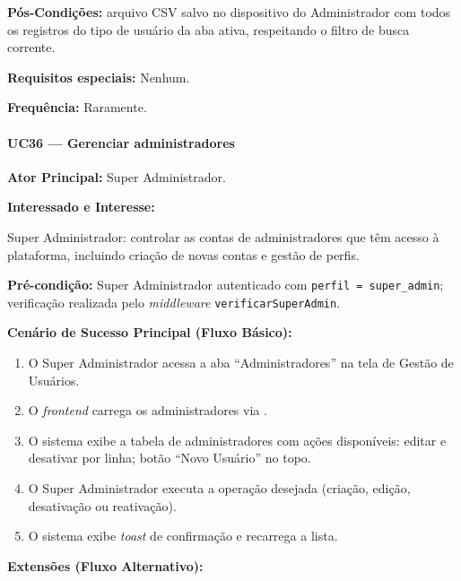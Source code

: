 \textbf{Pós-Condições:} arquivo CSV salvo no dispositivo
do Administrador com todos os registros do tipo de
usuário da aba ativa, respeitando o filtro de busca
corrente.

\textbf{Requisitos especiais:} Nenhum.

\textbf{Frequência:} Raramente.

\paragraph{UC36 --- Gerenciar administradores}\hfill\break

\textbf{Ator Principal:} Super Administrador.

\textbf{Interessado e Interesse:}

Super Administrador: controlar as contas de administradores
que têm acesso à plataforma, incluindo criação de novas
contas e gestão de perfis.

\textbf{Pré-condição:} Super Administrador autenticado
com \texttt{perfil = super\_admin}; verificação realizada
pelo \textit{middleware} \texttt{verificarSuperAdmin}.

\textbf{Cenário de Sucesso Principal (Fluxo Básico):}
\begin{enumerate}
  \item O Super Administrador acessa a aba
        ``Administradores'' na tela de Gestão de Usuários.
  \item O \textit{frontend} carrega os administradores
        via .
  \item O sistema exibe a tabela de administradores com
        ações disponíveis: editar e desativar por linha;
        botão ``Novo Usuário'' no topo.
  \item O Super Administrador executa a operação
        desejada (criação, edição, desativação ou
        reativação).
  \item O sistema exibe \textit{toast} de confirmação
        e recarrega a lista.
\end{enumerate}

\textbf{Extensões (Fluxo Alternativo):}

